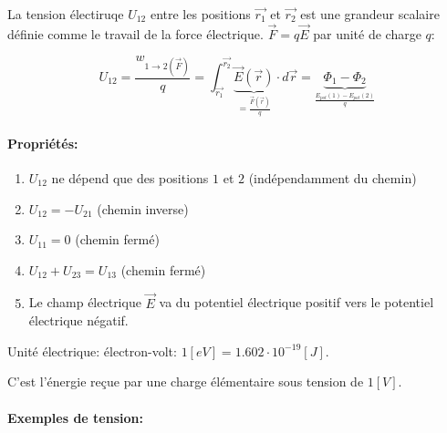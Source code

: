 \documentclass[
    11pt,
    a4paper,
    oneside,
    headinlcude, footinclude,
    twoside,
]{report}
\renewcommand{\vec}[1]{\overrightarrow{#1}}
\begin{document}
La tension électiruqe $U_{12}$ entre les positions $\vec{r_{1}}$ et $\vec{r_{2}}$
est une grandeur scalaire définie comme le travail de la force électrique.
$\vec F = q \vec E$ par unité de charge $q$:

\begin{equation}
    \label{eq:7.8}
    U_{12} = \frac{w_{1\to 2 (\vec F)}}{q}  = \int_{\vec{r_{1}}}^{\vec{r_{2}}}
    \underbrace{\vec E(\vec r)}_{= \frac{\vec F(\vec r)}{q}} \cdot d \vec r =
    \underbrace{\Phi_1 - \Phi_2}_{\frac{E_{pot}(1)- E_{pot}(2)}{q}}
\end{equation}

\paragraph{Propriétés:}

\begin{enumerate}
    \item $U_{12}$ ne dépend que des positions $1$ et $2$ (indépendamment du
        chemin)
    \item $U_{12} = - U_{21}$ (chemin inverse)
    \item $U_{11} = 0$ (chemin fermé)
    \item $U_{12} + U_{23} = U_{13}$ (chemin fermé)
    \item Le champ électrique $\vec E$ va du potentiel électrique positif vers
        le potentiel électrique négatif.
\end{enumerate}

Unité électrique: électron-volt: $1 [eV] = 1.602\cdot 10^{-19}[J]$.

C'est l'énergie reçue par une charge élémentaire sous tension de $1 [V]$.

\paragraph{Exemples de tension:}
\label{par:exemples_de_tension_}
\end{document}
